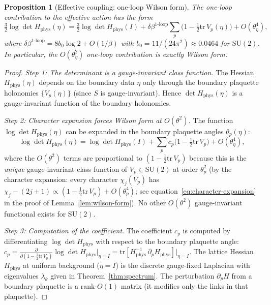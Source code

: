 \documentclass[11pt]{article}
\newtheorem{proposition}[theorem]{Proposition}
\theoremstyle{definition}
\newcommand{\SU}{\mathrm{SU}}
\newcommand{\tr}{\mathrm{tr}}
\begin{document}
\begin{proposition}[Effective coupling: one-loop Wilson form]%
\label{prop:betaeff}
The one-loop contribution to the effective action has the form
\begin{equation}\label{eq:betaeff}
\tfrac{3}{2}\log\det H_{\mathrm{phys}}(\eta)
=\tfrac{3}{2}\log\det H_{\mathrm{phys}}(I)
+\delta\beta^{1\text{-loop}}\sum_p
\bigl(1-\tfrac{1}{2}\tr\,V_p(\eta)\bigr)
+O(\theta_\eta^4),
\end{equation}
where $\delta\beta^{1\text{-loop}}=8b_0\log 2+O(1/\beta)$
with $b_0=11/(24\pi^2)\approx 0.0464$ for $\SU(2)$.
In particular, the $O(\theta_\eta^2)$ one-loop contribution
is \emph{exactly Wilson form}.
\end{proposition}

\begin{proof}
\emph{Step 1: The determinant is a gauge-invariant class function.}
The Hessian $H_{\mathrm{phys}}(\eta)$ depends on the boundary data
$\eta$ only through the boundary plaquette holonomies
$\{V_p(\eta)\}$ (since $S$ is gauge-invariant).  Hence
$\det H_{\mathrm{phys}}(\eta)$ is a gauge-invariant function
of the boundary holonomies.

\emph{Step 2: Character expansion forces Wilson form at $O(\theta^2)$.}
The function $\log\det H_{\mathrm{phys}}(\eta)$ can be expanded
in the boundary plaquette angles $\theta_p(\eta)$:
\[
\log\det H_{\mathrm{phys}}(\eta)
=\log\det H_{\mathrm{phys}}(I)
+\sum_p c_p\bigl(1-\tfrac{1}{2}\tr\,V_p\bigr)
+O(\theta_\eta^4),
\]
where the $O(\theta^2)$ terms are proportional to
$(1-\frac{1}{2}\tr\,V_p)$ because this is the \emph{unique}
gauge-invariant class function of $V_p\in\SU(2)$ at order
$\theta_p^2$ (by the character expansion: every character
$\chi_j(V_p)$ has $\chi_j-(2j+1)\propto
(1-\frac{1}{2}\tr\,V_p)+O(\theta_p^4)$;
see equation~\eqref{eq:character-expansion} in the proof
of Lemma~\ref{lem:wilson-form}).
No other $O(\theta^2)$ gauge-invariant functional exists for
$\SU(2)$.

\emph{Step 3: Computation of the coefficient.}
The coefficient $c_p$ is computed by differentiating
$\log\det H_{\mathrm{phys}}$ with respect to the boundary
plaquette angle:
$c_p=\frac{\partial}{\partial(1-\frac{1}{2}\tr\,V_p)}
\log\det H_{\mathrm{phys}}\big|_{\eta=I}
=\tr[H_{\mathrm{phys}}^{-1}\,\partial_p H_{\mathrm{phys}}]
\big|_{\eta=I}$.
The lattice Hessian $H_{\mathrm{phys}}$ at uniform background
($\eta=I$) is the discrete gauge-fixed Laplacian with
eigenvalues $\lambda_k$ given in
Theorem~\ref{thm:spectrum}.
The perturbation $\partial_p H$ from a boundary plaquette
is a rank-$O(1)$ matrix (it modifies only the links in that
plaquette).


\end{proof}
\end{document}

